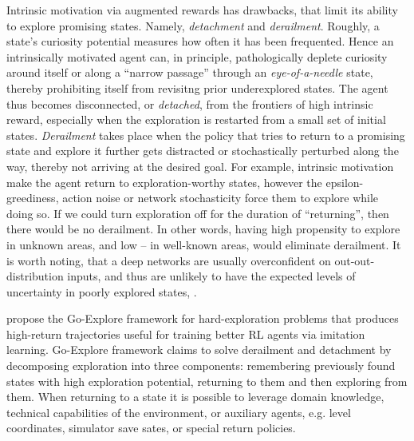 \documentclass[acmsmall, nonacm]{acmart}
\begin{document}
\medskip
Intrinsic motivation via augmented rewards has drawbacks, that limit its ability to
explore promising states. Namely, \emph{detachment} and \emph{derailment}.
%
Roughly, a state's curiosity potential measures how often it has been frequented. Hence
an intrinsically motivated agent can, in principle, pathologically deplete curiosity
around itself or along a ``narrow passage'' through an \emph{eye-of-a-needle} state,
thereby prohibiting itself from revisitng prior underexplored states. The agent thus
becomes disconnected, or \emph{detached}, from the frontiers of high intrinsic reward,
especially when the exploration is restarted from a small set of initial states.
%
\emph{Derailment} takes place when the policy that tries to return to a promising state
and explore it further gets distracted or stochastically perturbed along the way, thereby
not arriving at the desired goal.
%
For example, intrinsic motivation make the agent return to exploration-worthy states,
however the epsilon-greediness, action noise or network stochasticity force them to
explore while doing so. If we could turn exploration off for the duration of ``returning'',
then there would be no derailment. In other words, having high propensity to explore
in unknown areas, and low -- in well-known areas, would eliminate derailment.
%
It is worth noting, that a deep networks are usually overconfident on out-out-distribution
inputs, and thus are unlikely to have the expected levels of uncertainty in poorly explored
states, \citep[p.~34]{ecoffet_first_2021}.  %

\citet{ecoffet_go-explore_2021} propose the Go-Explore framework for hard-exploration
problems that produces high-return trajectories useful for training better RL agents
via imitation learning.
%
Go-Explore framework claims to solve derailment and detachment by decomposing exploration
into three components: remembering previously found states with high exploration potential,
returning to them and then exploring from them. When returning to a state it is possible
to leverage domain knowledge, technical capabilities of the environment, or auxiliary agents,
e.g. level coordinates, simulator save sates, or special return policies.
\end{document}
